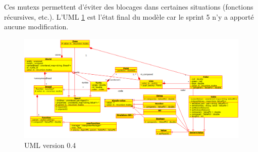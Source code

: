 Ces mutexs permettent d'éviter des blocages dans certaines situations (fonctions récursives, etc.).
L'UML \ref{v0.4} est l'état final du modèle car le sprint 5 n'y a apporté aucune modification.
\begin{figure}[h]
\includegraphics[scale=0.4]{doc/report/uml/v04.png}
\caption{\label{v0.4} UML version 0.4}
\end{figure}

